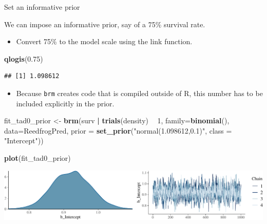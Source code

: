 \documentclass[
  ignorenonframetext,
]{beamer}
\newenvironment{Shaded}{\begin{snugshade}}{\end{snugshade}}
\newcommand{\DataTypeTok}[1]{\textcolor[rgb]{0.13,0.29,0.53}{#1}}
\newcommand{\DecValTok}[1]{\textcolor[rgb]{0.00,0.00,0.81}{#1}}
\newcommand{\FloatTok}[1]{\textcolor[rgb]{0.00,0.00,0.81}{#1}}
\newcommand{\KeywordTok}[1]{\textcolor[rgb]{0.13,0.29,0.53}{\textbf{#1}}}
\newcommand{\NormalTok}[1]{#1}
\newcommand{\OperatorTok}[1]{\textcolor[rgb]{0.81,0.36,0.00}{\textbf{#1}}}
\newcommand{\StringTok}[1]{\textcolor[rgb]{0.31,0.60,0.02}{#1}}
\providecommand{\tightlist}{%
  \setlength{\itemsep}{0pt}\setlength{\parskip}{0pt}}
\begin{document}
\begin{frame}[fragile]{Set an informative prior}
\protect\hypertarget{set-an-informative-prior}{}

We can impose an informative prior, say of a 75\% survival rate.

\begin{itemize}
\tightlist
\item
  Convert 75\% to the model scale using the link function.
\end{itemize}

\scriptsize

\begin{Shaded}
\begin{Highlighting}[]
\KeywordTok{qlogis}\NormalTok{(}\FloatTok{0.75}\NormalTok{)}
\end{Highlighting}
\end{Shaded}

\begin{verbatim}
## [1] 1.098612
\end{verbatim}

\normalsize

\begin{itemize}
\tightlist
\item
  Because \texttt{brm} creates code that is compiled outside of R, this
  number has to be included explicitly in the prior.
\end{itemize}

\scriptsize

\begin{Shaded}
\begin{Highlighting}[]
\NormalTok{fit_tad0_prior <-}\StringTok{ }\KeywordTok{brm}\NormalTok{(surv }\OperatorTok{|}\StringTok{ }\KeywordTok{trials}\NormalTok{(density) }\OperatorTok{~}\StringTok{ }\DecValTok{1}\NormalTok{, }
                      \DataTypeTok{family=}\KeywordTok{binomial}\NormalTok{(), }\DataTypeTok{data=}\NormalTok{ReedfrogPred, }
                      \DataTypeTok{prior =} \KeywordTok{set_prior}\NormalTok{(}\StringTok{"normal(1.098612,0.1)"}\NormalTok{, }
                                        \DataTypeTok{class =} \StringTok{"Intercept"}\NormalTok{))}
\end{Highlighting}
\end{Shaded}

\begin{Shaded}
\begin{Highlighting}[]
\KeywordTok{plot}\NormalTok{(fit_tad0_prior)}
\end{Highlighting}
\end{Shaded}

\includegraphics{intro_Bayes_files/figure-beamer/unnamed-chunk-11-1.pdf}

\end{frame}
\end{document}
